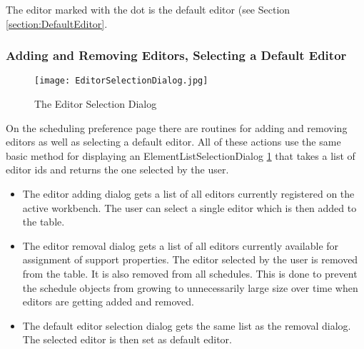 The editor marked with the dot is the default editor (see Section \ref{section:DefaultEditor}.

\subsubsection{Adding and Removing Editors, Selecting a Default Editor}
\begin{figure}
  \centering
  \texttt{[image: EditorSelectionDialog.jpg]}
  \caption[Editor Selection Dialog]%
  {The Editor Selection Dialog\protect}
  \label{fig:EditorSelectionDialog}
\end{figure}

On the scheduling preference page there are routines for adding and removing
editors as well as selecting a default editor.
All of these actions use the same basic method for displaying an ElementListSelectionDialog \ref{fig:EditorSelectionDialog}
that takes a list of editor ids and returns the one selected by the user.
\begin{itemize}
 \item The editor adding dialog gets a list of all editors currently registered on the
 active workbench. The user can select a single editor which is then added to the table.
 \item The editor removal dialog gets a list of all editors currently available for 
 assignment of support properties. The editor selected by the user is removed from the table.
 It is also removed from all schedules. This is done to prevent the schedule objects from growing
 to unnecessarily large size over time when editors are getting added and removed.
 \item The default editor selection dialog gets the same list as the removal dialog. The selected
 editor is then set as default editor. 
\end{itemize}


